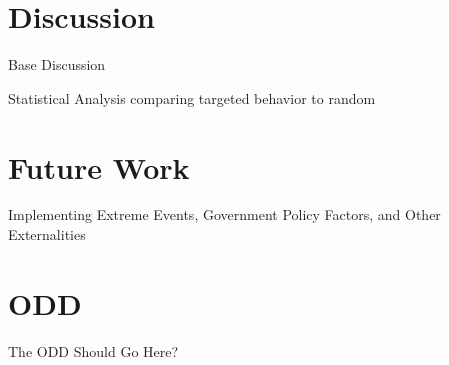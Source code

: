 \documentclass[prepare]{acmconf} %
\begin{document}
\section{Discussion}

Base Discussion

Statistical Analysis comparing targeted behavior to random

\section{Future Work}

Implementing Extreme Events, Government Policy Factors, and Other 
Externalities




\appendix
\section{ODD}
\label{apx:odd}

The ODD Should Go Here?
\end{document}
